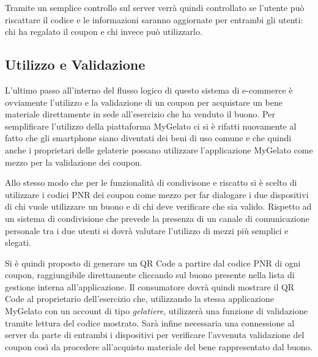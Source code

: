 Tramite un semplice controllo sul server verrà quindi controllato
se l'utente può riscattare il codice e le informazioni saranno aggiornate
per entrambi gli utenti: chi ha regalato il coupon e chi invece può
utilizzarlo.

\subsection{Utilizzo e Validazione}

L'ultimo passo all'interno del flusso logico di questo sistema di
e-commerce è ovviamente l'utilizzo e la validazione di un coupon per
acquistare un bene materiale direttamente in sede all'esercizio che
ha venduto il buono. Per semplificare l'utilizzo della piattaforma
MyGelato ci si è rifatti nuovamente al fatto che gli smartphone siano
diventati dei beni di uso comune e che quindi anche i proprietari
delle gelaterie possano utilizzare l'applicazione MyGelato come mezzo
per la validazione dei coupon.\bigskip{}

Allo stesso modo che per le funzionalità di condivisone e riscatto
si è scelto di utilizzare i codici PNR dei coupon come mezzo per far
dialogare i due dispositivi di chi vuole utilizzare un buono e di
chi deve verificare che sia valido. Rispetto ad un sistema di condivisione
che prevede la presenza di un canale di comunicazione personale tra
i due utenti si dovrà valutare l'utilizzo di mezzi più semplici e
slegati.

Si è quindi proposto di generare un QR Code a partire dal codice PNR
di ogni coupon, raggiungibile direttamente cliccando sul buono presente
nella lista di gestione interna all'applicazione. Il consumatore dovrà
quindi mostrare il QR Code al proprietario dell'esercizio che, utilizzando
la stessa applicazione MyGelato con un account di tipo \emph{gelatiere},
utilizzerà una funzione di validazione tramite lettura del codice
mostrato. Sarà infine necessaria una connessione al server da parte
di entrambi i dispositivi per verificare l'avvenuta validazione del
coupon così da procedere all'acquisto materiale del bene rappresentato
dal buono.

\newpage{}
